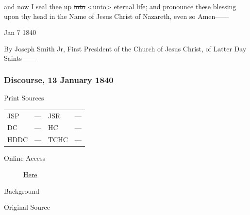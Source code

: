 				and now I seal thee up \sout{into} <unto> eternal life; and pronounce these blessing upon thy head in the Name of Jesus Christ of Nazareth, even so Amen------

				Jan 7 1840

				By Joseph Smith Jr, First President of the Church of Jesus Christ, of Latter Day Saints------
				
		\subsubsection{Discourse, 13 January 1840}
			\label{EMS-1840-JS-13-JAN-1840}
			
			\begin{description}
				\item[Print Sources]
			\end{description}

			\begin{tabular}{p{0.5in}p{1in}p{0.5in}p{1in}}
				JSP	 	& ---		& JSR 		& --- \\
				DC	 	& ---		& HC 		& --- \\
				HDDC 	& ---		& TCHC 		& --- \\
			\end{tabular}
			
			\begin{description}
				\item[Online Access] \href{https://www.josephsmithpapers.org/paper-summary/minutes-and-discourse-13-january-1840/1}{Here}
			\end{description}
			
			\begin{description}
				\item[Background]
			\end{description}
			
			
			\begin{description}
				\item[Original Source]
			\end{description}
			
